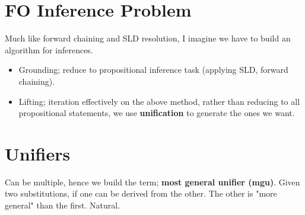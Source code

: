 \documentclass{article}
\begin{document}
\section{FO Inference Problem}
Much like forward chaining and SLD resolution, I imagine we have to build an algorithm for inferences.

\begin{itemize}
	\item Grounding; reduce to propositional inference task (applying SLD, forward chaining).
	\item Lifting; iteration effectively on the above method, rather than reducing to all propositional statements, we use \textbf{unification} to generate the ones we want.
\end{itemize}

\section{Unifiers}
Can be multiple, hence we build the term; \textbf{most general unifier (mgu)}. Given two substitutions, if one can be derived from the other. The other is "more general" than the first. Natural.
\end{document}
